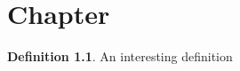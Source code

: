 \documentclass[baselinegrid,parindent,noprint,nocopyright]{uit-thesis-test}
\theoremstyle{definition}
\newtheorem{definition}{Definition}
\begin{document}
\mainmatter

\chapter{Chapter}
\lipsum[1][1-4]

\begin{definition}
  An interesting definition
\end{definition}

\lipsum[2][1-4]
\end{document}
